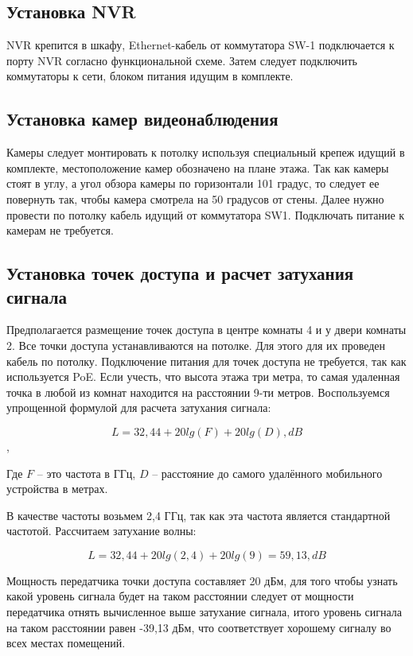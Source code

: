 \subsection{Установка NVR}

NVR крепится в шкафу, Ethernet-кабель от коммутатора SW-1 подключается к порту NVR согласно функциональной схеме.
Затем следует подключить коммутаторы к сети, блоком питания идущим в комплекте.

\subsection{Установка камер видеонаблюдения}

Камеры следует монтировать к потолку используя специальный крепеж идущий в комплекте, местоположение камер
обозначено на плане этажа. Так как камеры стоят в углу, а угол обзора камеры по горизонтали 101 градус, то следует ее повернуть так,
чтобы камера смотрела на 50 градусов от стены. Далее 
нужно провести по потолку кабель идущий от коммутатора SW1. Подключать питание к камерам не требуется.

\subsection{Установка точек доступа и расчет затухания сигнала}

Предполагается размещение точек доступа в центре комнаты 4 и у двери комнаты 2. Все точки доступа устанавливаются на потолке.
Для этого для их проведен кабель по потолку. Подключение питания для точек доступа не требуется, так как используется PoE.
Если учесть, что высота этажа три метра, то самая удаленная точка в любой из комнат находится на расстоянии 9-ти метров. 
Воспользуемся упрощенной формулой для расчета затухания сигнала:

\[L = 32,44 + 20lg(F) + 20lg(D), dB\],

Где \(F\) – это частота в ГГц, \(D\) – расстояние до самого удалённого мобильного устройства в метрах.

В качестве частоты возьмем 2,4 ГГц, так как эта частота является стандартной частотой. 
Рассчитаем затухание волны:

\[L = 32,44 + 20lg(2,4) + 20lg(9) = 59,13, dB\]

Мощность передатчика точки доступа составляет 20 дБм, для того чтобы узнать какой уровень сигнала будет на таком 
расстоянии следует от мощности передатчика отнять вычисленное выше затухание сигнала, итого уровень сигнала на 
таком расстоянии равен -39,13 дБм, что соответствует хорошему сигналу во всех местах помещений. 

